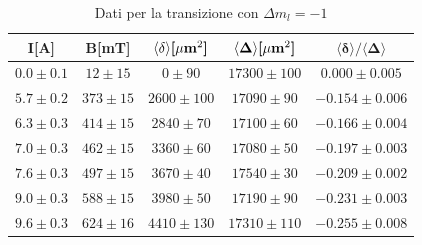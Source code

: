 \begin{table}[H]
    \centering
    \begin{tabular}{|c|c|c|c|c|} \hline

\textbf{I[A]} & \textbf{B[mT]} & $\mathbf{\langle\delta\rangle}\text{\textbf{[}}\mathbf{\mu}\text{\textbf{m}}^2\textbf{]}$  & $\mathbf{\langle\Delta\rangle}\text{\textbf{[}}\mathbf{\mu}\text{\textbf{m}}^2\textbf{]}$  & $\mathbf{\langle\delta\rangle/\langle\Delta\rangle}$ \\ \hline\hline
$0.0	\pm0.1	$&$12\pm15   $&$0	\pm90	$&$17300\pm100	$&$0.000	\pm0.005$\\ \hline
$5.7	\pm0.2	$&$373\pm15 $&$2600	\pm100	$&$17090\pm90	$&$-0.154	\pm0.006$\\ \hline
$6.3	\pm0.3	$&$414\pm15 $&$2840	\pm70	$&$17100\pm60	$&$-0.166	\pm0.004$\\ \hline
$7.0	\pm0.3	$&$462\pm15 $&$3360	\pm60	$&$17080\pm50	$&$-0.197	\pm0.003$\\ \hline
$7.6	\pm0.3	$&$497\pm15 $&$3670	\pm40	$&$17540\pm30	$&$-0.209	\pm0.002$\\ \hline
$9.0	\pm0.3	$&$588\pm15 $&$3980	\pm50	$&$17190\pm90	$&$-0.231	\pm0.003$\\ \hline
$9.6	\pm0.3	$&$624\pm16 $&$4410	\pm130	$&$17310\pm110	$&$-0.255	\pm0.008$\\ \hline
\end{tabular}
    \label{tab:trasv_down}
    \caption{Dati per la transizione con $\Delta m_l = -1$}
\end{table}
